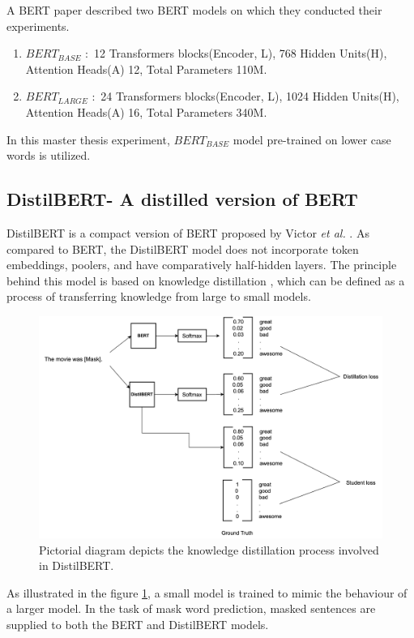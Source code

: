 \documentclass[%
	BCOR=8mm, %
	DIV=12,
	toc=bibliography, %
	toc=listof, %
	oneside, %
	egregdoesnotlikesansseriftitles, %
	]{scrbook}
\begin{document}
A BERT paper \cite{devlin_bert_2019-1} described two BERT models on which they conducted their experiments. 
\begin{enumerate}
    \item $BERT_{BASE}$ $:$ 12 Transformers blocks(Encoder, L), 768 Hidden Units(H), Attention Heads(A) 12, Total Parameters 110M.
    \item $BERT_{LARGE}$ $:$ 24 Transformers blocks(Encoder, L), 1024 Hidden Units(H), Attention Heads(A) 16, Total Parameters 340M.
\end{enumerate}
In this master thesis experiment, $BERT_{BASE}$ model  pre-trained on lower case words is utilized. 

\subsection{DistilBERT- A distilled version of BERT}
DistilBERT is a compact version of BERT proposed by Victor \textit{et al.} \cite{sanh_distilbert_2020}. As compared to BERT, the DistilBERT model does not incorporate token embeddings, poolers, and have comparatively half-hidden layers. The principle behind this model is based on knowledge distillation \cite{hinton_distilling_2015}, which can be defined as a process of transferring knowledge from large  to small models. \\
\begin{figure}[H]
    \centering
    \includegraphics[width=0.89\linewidth]{img/DistilBERT.png}
    \caption[Diagram of DistilBERT training.]{ Pictorial diagram depicts the knowledge distillation process involved in  DistilBERT.}
    \label{fig:DistilBERT}
\end{figure}
As illustrated in the figure \ref{fig:DistilBERT}, a small model is trained to mimic the behaviour of a larger model. In the task of mask word prediction, masked sentences are supplied to both the BERT and DistilBERT models.\\
\end{document}

